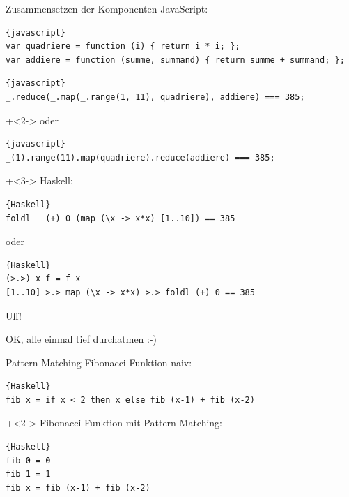\begin{frame}[fragile]{Zusammensetzen der Komponenten}
JavaScript:
\begin{lstlisting}{javascript}
var quadriere = function (i) { return i * i; };
var addiere = function (summe, summand) { return summe + summand; };
\end{lstlisting}

\begin{lstlisting}{javascript}
_.reduce(_.map(_.range(1, 11), quadriere), addiere) === 385;
\end{lstlisting}

\onslide+<2->
oder

\begin{lstlisting}{javascript}
_(1).range(11).map(quadriere).reduce(addiere) === 385;
\end{lstlisting}

\onslide+<3->
Haskell:
\begin{lstlisting}{Haskell}
foldl	(+) 0 (map (\x -> x*x) [1..10]) == 385
\end{lstlisting}
oder
\begin{lstlisting}{Haskell}
(>.>) x f = f x
[1..10] >.> map (\x -> x*x) >.> foldl (+) 0 == 385
\end{lstlisting}

\end{frame}

\begin{frame}[fragile]{Uff!}

\begin{center}
\Large
OK, alle einmal tief durchatmen :-)
\end{center}

\end{frame}

\begin{frame}[fragile]{Pattern Matching}
Fibonacci-Funktion \glqq naiv\grqq{}:
\begin{lstlisting}{Haskell}
fib x = if x < 2 then x else fib (x-1) + fib (x-2)
\end{lstlisting}

\onslide+<2->
\vfill
Fibonacci-Funktion mit Pattern Matching:
\begin{lstlisting}{Haskell}
fib 0 = 0
fib 1 = 1
fib x = fib (x-1) + fib (x-2)
\end{lstlisting}
\end{frame}

